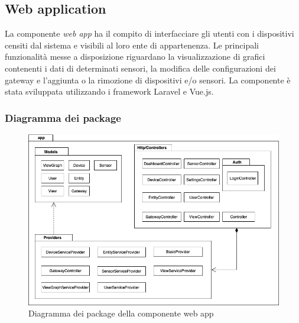 \subsection{Web application}
	La componente \textit{web app} ha il compito di interfacciare gli utenti con i dispositivi censiti dal sistema e visibili al loro ente di appartenenza.
	\newline
	Le principali funzionalità messe a disposizione riguardano la visualizzazione di grafici contenenti i dati di determinati sensori, la modifica delle configurazioni dei gateway e l'aggiunta o la rimozione di dispositivi e/o sensori.
	\newline 
	La componente è stata sviluppata utilizzando i framework Laravel e Vue.js.
	
	\subsubsection{Diagramma dei package}%
		\begin{figure}[H]
			\centering
			\includegraphics[scale=0.600]{res/images/WEBAPP/WebAppPackage.png}
			\caption{Diagramma dei package della componente web app}
			\label{Diagramma 21}
		\end{figure}


